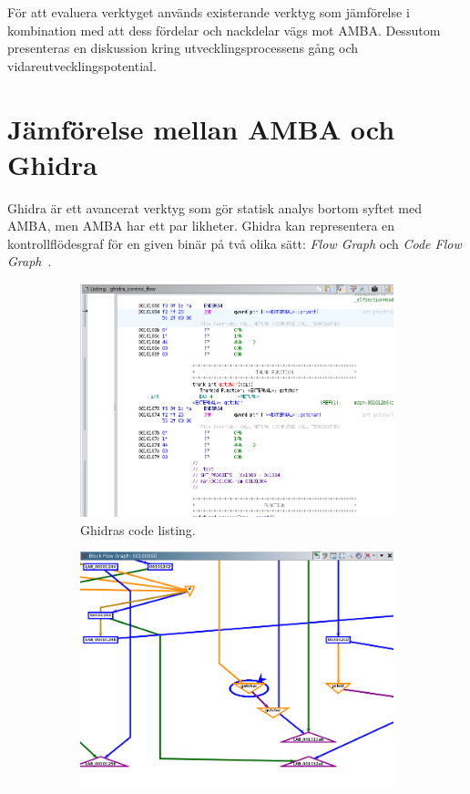 För att evaluera verktyget används existerande verktyg som jämförelse i
kombination med att dess fördelar och nackdelar vägs mot AMBA. Dessutom
presenteras en diskussion kring utvecklingsprocessens gång och
vidareutvecklingspotential.

\section{Jämförelse mellan AMBA och Ghidra} Ghidra är ett avancerat verktyg som
gör statisk analys bortom syftet med AMBA, men AMBA har ett par likheter. Ghidra
kan representera en kontrollflödesgraf för en given binär på två olika sätt:
\textit{Flow Graph} och \textit{Code Flow Graph}~\cite{ghidra_website}.

\begin{figure}[H]
    \begin{subfigure}{0.3\textwidth}
        \includegraphics[width=\linewidth]{figures/ghidra_code_listing.png}
        \caption{Ghidras code listing.} \label{fig:ghidra_code_listing}
    \end{subfigure}
    \hspace*{\fill}
    \begin{subfigure}{0.3\textwidth}
        \includegraphics[width=\linewidth]{figures/ghidra_block_flow_graph.png}

\end{subfigure}
\end{figure}
